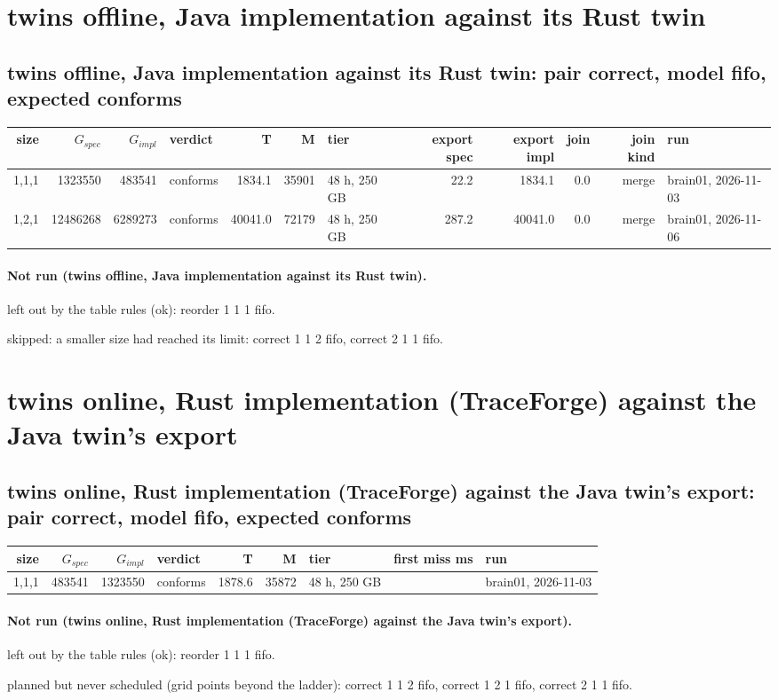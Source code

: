 \documentclass[10pt]{article}
\begin{document}
\section*{twins offline, Java implementation against its Rust twin}
\subsection*{twins offline, Java implementation against its Rust twin: pair \textsf{correct}, model fifo, expected conforms}
\begin{longtable}{@{}rrrlrrlrrrrl@{}}
\toprule
size & $G_{\mathit{spec}}$ & $G_{\mathit{impl}}$ & verdict & T & M & tier & export spec & export impl & join & join kind & run \\
\midrule
\endhead
\color{blue} 1,1,1 & 1323550 & 483541 & conforms & 1834.1 & 35901 & 48 h, 250 GB & 22.2 & 1834.1 & 0.0 & merge & brain01, 2026-11-03 \\
\color{blue} 1,2,1 & 12486268 & 6289273 & conforms & 40041.0 & 72179 & 48 h, 250 GB & 287.2 & 40041.0 & 0.0 & merge & brain01, 2026-11-06 \\
\bottomrule
\end{longtable}
\paragraph{Not run (twins offline, Java implementation against its Rust twin).}
left out by the table rules (ok): reorder 1 1 1 fifo.\par
skipped: a smaller size had reached its limit: correct 1 1 2 fifo, correct 2 1 1 fifo.\par
\section*{twins online, Rust implementation (TraceForge) against the Java twin's export}
\subsection*{twins online, Rust implementation (TraceForge) against the Java twin's export: pair \textsf{correct}, model fifo, expected conforms}
\begin{longtable}{@{}rrrlrrlrl@{}}
\toprule
size & $G_{\mathit{spec}}$ & $G_{\mathit{impl}}$ & verdict & T & M & tier & first miss ms & run \\
\midrule
\endhead
\color{blue} 1,1,1 & 483541 & 1323550 & conforms & 1878.6 & 35872 & 48 h, 250 GB &  & brain01, 2026-11-03 \\
\bottomrule
\end{longtable}
\paragraph{Not run (twins online, Rust implementation (TraceForge) against the Java twin's export).}
left out by the table rules (ok): reorder 1 1 1 fifo.\par
planned but never scheduled (grid points beyond the ladder): correct 1 1 2 fifo, correct 1 2 1 fifo, correct 2 1 1 fifo.\par
\end{document}
